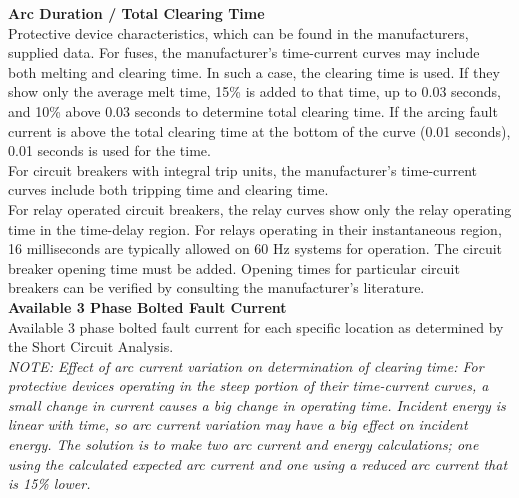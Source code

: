 \noindent\textbf{Arc Duration / Total Clearing Time   } \\
\noindent Protective device characteristics, which can be found in the manufacturers, supplied data. For fuses, the manufacturer's time-current curves may include both melting and clearing time. In such a case, the clearing time is used. If they show only the average melt time, 15\% is added to that time, up to 0.03 seconds, and 10\% above 0.03 seconds to determine total clearing time. If the arcing fault current is above the total clearing time at the bottom of the curve (0.01 seconds), 0.01 seconds is used for the time. \\
For circuit breakers with integral trip units, the manufacturer's time-current curves include both tripping time and clearing time. \\

\noindent For relay operated circuit breakers, the relay curves show only the relay operating time in the time-delay region. For relays operating in their instantaneous region, 16 milliseconds are typically allowed on 60 Hz systems for operation. The circuit breaker opening time must be added. Opening times for particular circuit breakers can be verified by consulting the manufacturer's literature. \\
 
  
\noindent\textbf{Available 3 Phase Bolted Fault Current}  \\ 
Available 3 phase bolted fault current for each specific location as determined by the Short Circuit Analysis. \\
 
\noindent\emph{NOTE: Effect of arc current variation on determination of clearing time:    
For protective devices operating in the steep portion of their time-current curves, a small change in current causes a big change in operating time. Incident energy is linear with time, so arc current variation may have a big effect on incident energy. The solution is to make two arc current and energy calculations; one using the calculated expected arc current and one using a reduced arc current that is 15\% lower.}\\ 
